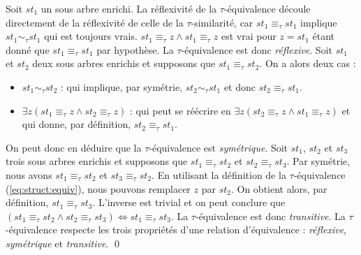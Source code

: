 \begin{proposition}
    Soit $st_1$ un sous arbre enrichi.
    La réflexivité de la $\tau$-équivalence découle directement de la réflexivité de celle de la $\tau$-similarité, car $st_1 \equiv_\tau st_1$ implique $st_1 \sim_\tau st_1$ qui est toujours vrais.
    $st_1 \equiv_\tau z \land st_1 \equiv_\tau z$ est vrai pour $z = st_1$ étant donné que $st_1 \equiv_\tau st_1$ par hypothèse.
    La $\tau$-équivalence est donc \emph{réflexive}.
    Soit $st_1$ et $st_2$ deux sous arbres enrichis et supposons que $st_1 \equiv_\tau st_2$.
    On a alors deux cas :
    \begin{itemize}
        \item  $st_1 \sim_\tau st_2$ : qui implique, par symétrie, $st_2 \sim_\tau st_1$ et donc  $st_2 \equiv_\tau st_1$.
        \item $\exists z (st_1 \equiv_\tau z \land st_2 \equiv_\tau z)$ : qui peut se réécrire en $\exists z (st_2 \equiv_\tau z \land st_1 \equiv_\tau z)$ et qui donne, par définition, $st_2 \equiv_\tau st_1$.
    \end{itemize}
    On peut donc en déduire que la $\tau$-équivalence est \emph{symétrique}.
    Soit $st_1$, $st_2$ et $st_3$ trois sous arbres enrichis et supposons que $st_1 \equiv_\tau st_2$ et $st_2 \equiv_\tau st_3$.
    Par symétrie, nous avons $st_1 \equiv_\tau st_2$ et $st_3 \equiv_\tau st_2$.
    En utilisant la définition de la $\tau$-équivalence (\ref{eq:struct:equiv}), nous pouvons remplacer $z$ par $st_2$.
    On obtient alors, par définition, $st_1 \equiv_\tau st_3$.
    L'inverse est trivial et on peut conclure que $(st_1 \equiv_\tau st_2 \land st_2 \equiv_\tau st_3) \iff st_1 \equiv_\tau st_3$.
    La $\tau$-équivalence est donc \emph{transitive}.
    La $\tau$-équivalence respecte les trois propriétés d'une relation d'équivalence : \emph{réflexive}, \emph{symétrique} et \emph{transitive}.
    \qed
\end{proposition}


